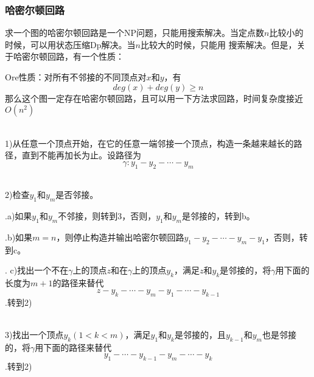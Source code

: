 \subsubsection{哈密尔顿回路}

求一个图的哈密尔顿回路是一个NP问题，只能用搜索解决。当定点数$n$比较小的时候，可以用状态压缩Dp解决。当$n$比较大的时候，只能用
搜索解决。但是，关于哈密尔顿回路，有一个性质：\par
Ore性质：对所有不邻接的不同顶点对$x$和$y$，有$$deg(x)+deg(y)\geq n$$
那么这个图一定存在哈密尔顿回路，且可以用一下方法求回路，时间复杂度接近$O(n^2)$ \par

~\\

1)从任意一个顶点开始，在它的任意一端邻接一个顶点，构造一条越来越长的路径，直到不能再加长为止。设路径为$$\gamma:y_1-y_2-\cdots-y_m$$

~\\

2)检查$y_1$和$y_m$是否邻接。\par
.\quad \quad a)如果$y_1$和$y_m$不邻接，则转到3，否则，$y_1$和$y_m$是邻接的，转到b。\par
.\quad \quad b)如果$m=n$，则停止构造并输出哈密尔顿回路$y_1-y_2-\cdots-y_m-y_1$，否则，转到c。\par
.\quad \quad
c)找出一个不在$\gamma$上的顶点$z$和在$\gamma$上的顶点$y_k$，满足$z$和$y_k$是邻接的，将$\gamma$用下面的长度为$m+1$的路径来替代
$$z-y_k-\cdots-y_m-y_1-\cdots-y_{k-1}$$
.\quad \quad 转到2)

~\\

3)找出一个顶点$y_k(1<k<m)$，满足$y_1$和$y_k$是邻接的，且$y_{k-1}$和$y_{m}$也是邻接的，将$\gamma$用下面的路径来替代
$$y_1-\cdots-y_{k-1}-y_{m}-\cdots-y_k$$
.\quad \quad 转到2)
